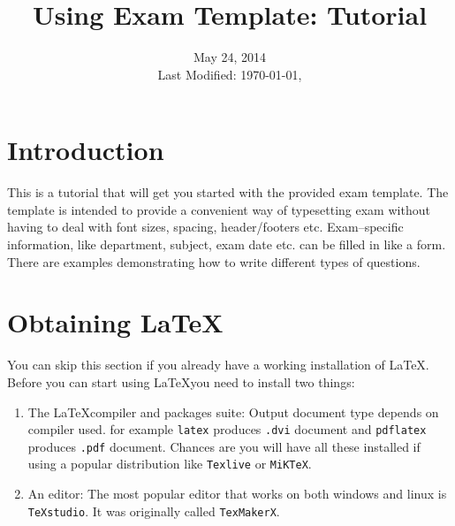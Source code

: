 \documentclass[12pt,a4paper]{article}
\title{\vspace{-2cm}Using Exam Template: Tutorial}
\author{}
\date{May 24, 2014\\[0.2cm] Last Modified: \today, \currenttime}
\begin{document}
\maketitle
\section{Introduction}
This is a tutorial that will get you started with the provided exam template. The template is intended to provide a convenient way of typesetting exam without having to deal with font sizes, spacing, header/footers etc. Exam--specific information, like department, subject, exam date etc. can be filled in like a form. There are examples demonstrating how to write different types of questions.
\section{Obtaining \LaTeX}
You can skip this section if you already have a working installation of \LaTeX. Before you can start using \LaTeX you need to install two things:
\begin{enumerate}
\item The \LaTeX compiler and packages suite: Output document type depends on compiler used. for example \verb|latex| produces \verb|.dvi| document and \verb|pdflatex| produces \verb|.pdf| document. Chances are you will have all these installed if using a popular distribution like \verb|Texlive| or \verb|MiKTeX|.
\item An editor: The most popular editor that works on both windows and linux is \verb|TeXstudio|. It was originally called \verb|TexMakerX|.
\end{enumerate}
\end{document}
